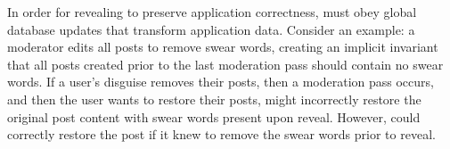 In order for revealing to preserve application correctness, \sys must obey 
global database updates that transform application data.
%
Consider an example: a moderator edits all posts to remove
swear words, creating an implicit invariant that all posts created prior to the
last moderation pass should contain no swear words.
%
If a user's disguise removes their posts, then a moderation pass occurs, and
then the user wants to restore their posts, \sys might incorrectly restore the
original post content with swear words present upon reveal.
%
However, \sys could correctly restore the post if it knew to remove the swear
words prior to reveal.
%
%
%

